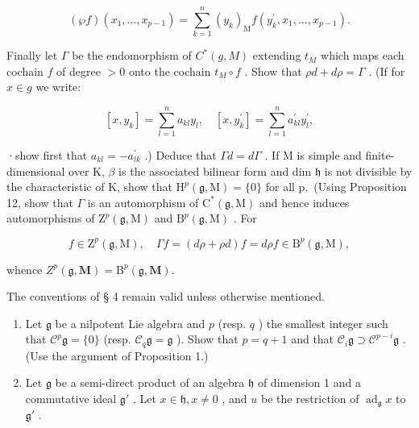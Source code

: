 \[
(\wp f) (x _ {1}, \dots , x _ {p - 1}) = \sum_ {k = 1} ^ {n} (y _ {k}) _ {\mathrm{M}} f (y _ {k} ^ {\prime}, x _ {1}, \dots , x _ {p - 1}).
\]

Finally let \(\Gamma\) be the endomorphism of \(C^*(g, M)\) extending \(t_M\) which maps each cochain \(f\) of degree \(>0\) onto the cochain \(t_M \circ f\) . Show that \(\rho d + d\rho = \Gamma\) . (If for \(x \in g\) we write:

\[
[ x, y _ {k} ] = \sum_ {l = 1} ^ {n} a _ {k l} y _ {l}, \quad [ x, y _ {k} ^ {\prime} ] = \sum_ {l = 1} ^ {n} a _ {k l} ^ {\prime} y _ {l} ^ {\prime},
\]

·show first that \(a_{kl} = -a_{lk}^{\prime}\) .) Deduce that \(\Gamma d = d\Gamma\) . If M is simple and finite-dimensional over K, \(\beta\) is the associated bilinear form and dim \(\mathfrak{h}\) is not divisible by the characteristic of K, show that \(\mathrm{H}^{p}(\mathfrak{g},\mathrm{M})=\{0\}\) for all p.~(Using Proposition 12, show that \(\Gamma\) is an automorphism of \(\mathrm{C}^{*}(\mathfrak{g},\mathrm{M})\) and hence induces automorphisms of \(\mathrm{Z}^{p}(\mathfrak{g},\mathrm{M})\) and \(\mathrm{B}^{p}(\mathfrak{g},\mathrm{M})\) . For

\[
f \in \mathrm{Z} ^ {p} (\mathfrak {g}, \mathrm{M}), \quad \Gamma f = (d \rho + \rho d) f = d \rho f \in \mathrm{B} ^ {p} (\mathfrak {g}, \mathrm{M}),
\]

whence \(Z^{p}(\mathfrak{g},\mathbf{M}) = \mathrm{B}^{p}(\mathfrak{g},\mathbf{M}).\)


The conventions of § 4 remain valid unless otherwise mentioned.

\begin{enumerate}
\def\labelenumi{\arabic{enumi}.}
\item
  Let \(\mathfrak{g}\) be a nilpotent Lie algebra and \(p\) (resp. \(q\) ) the smallest integer such that \(\mathcal{C}^p\mathfrak{g} = \{0\}\) (resp. \(\mathcal{C}_q\mathfrak{g} = \mathfrak{g}\) ). Show that \(p = q + 1\) and that \(\mathcal{C}_i\mathfrak{g} \supset \mathcal{C}^{p - i}\mathfrak{g}\) . (Use the argument of Proposition 1.)
\item
  Let \(\mathfrak{g}\) be a semi-direct product of an algebra \(\mathfrak{h}\) of dimension 1 and a commutative ideal \(\mathfrak{g}'\) . Let \(x \in \mathfrak{h}, x \neq 0\) , and \(u\) be the restriction of \(\operatorname{ad}_{\mathfrak{g}} x\) to \(\mathfrak{g}'\) .
\end{enumerate}

